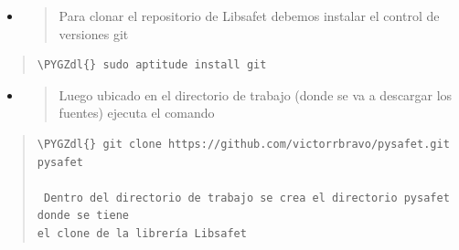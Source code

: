 \documentclass[letterpaper,11pt,spanish]{sphinxmanual}
\def\PYGZdl{\char`\$}
\begin{document}
\begin{itemize}
\item {} \begin{quote}\begin{description}
\item[{Para clonar el repositorio de Libsafet debemos instalar el control de versiones git}] \leavevmode
\end{description}\end{quote}

\end{itemize}
\begin{quote}

\begin{Verbatim}[commandchars=\\\{\}]
\PYGZdl{} sudo aptitude install git
\end{Verbatim}
\end{quote}
\begin{itemize}
\item {} \begin{quote}\begin{description}
\item[{Luego ubicado en el directorio de trabajo (donde se va a descargar los fuentes) ejecuta el comando}] \leavevmode
\end{description}\end{quote}

\end{itemize}
\begin{quote}

\begin{Verbatim}[commandchars=\\\{\}]
\PYGZdl{} git clone https://github.com/victorrbravo/pysafet.git pysafet

 Dentro del directorio de trabajo se crea el directorio pysafet donde se tiene
el clone de la librería Libsafet
\end{Verbatim}
\end{quote}
\end{document}
